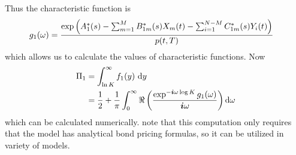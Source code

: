 Thus the characteristic function is
\begin{align}
g_1 (\omega) &= \frac{ \exp \left( A_1^*(s) - \sum_{m=1}^M B_{1m}^*(s) X_m(t) - \sum_{i=1}^{N-M} C_{1m}^*(s) Y_i(t)  \right) }{p(t,T)} 
\end{align}
which allows us to calculate the values of characteristic functions. Now
	\begin{align}
		\Pi_1 &= \int_{\ln K}^{\infty} f_1(y) \ \mathrm{d} y \\
			&= \frac{1}{2} + \frac{1}{\pi} \int_0^{\infty} \Re \left( \frac{\exp^{-\boldsymbol{i}\omega \log K} g_1(\omega)}{\boldsymbol{i} \omega} \right) \mathrm{d} \omega
	\end{align}
which can be calculated numerically. \textcite{nawalkabeliaevasoto2007dynamic} note that this computation only requires that the model has analytical bond pricing formulas, so it can be utilized in variety of models.


